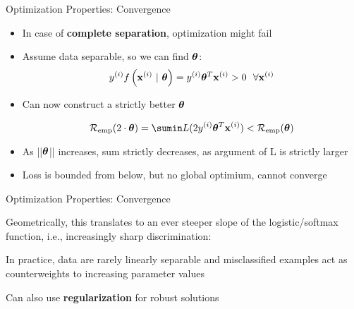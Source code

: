 \documentclass[11pt,compress,t,notes=noshow, xcolor=table]{beamer}
\begin{document}
\begin{frame2}[footnotesize]{Optimization Properties: Convergence}


\begin{itemize}

\item In case of \textbf{complete separation}, optimization might 
fail

{
}

\item Assume data separable, so we can find $\bm{\theta}$:
$$ y^{(i)} f\left(\mathbf{x}^{(i)} ~|~ \bm{\theta}\right) = y^{(i)} \bm{\theta}^T \mathbf{x}^{(i)} > 0 ~~ \forall \mathbf{x}^{(i)}$$

\item Can now construct a strictly better $\bm{\theta}$

$$    
\riske(2 \cdot \thetav) = \sumin L ( 2 \yi \thetav^T \xi) < \risket
$$

\item As ||$\bm{\theta}$|| increases, sum strictly decreases, as argument of L is strictly larger

\item Loss is bounded from below, but no global optimium, cannot converge
\end{itemize}

\end{frame2}

\begin{framei}[sep=L]{Optimization Properties: Convergence}

\item
Geometrically, this translates to an ever steeper slope of the 
logistic/softmax function, i.e., increasingly sharp discrimination:

\vfill

%
{
}%
\item In practice, data are rarely linearly separable and misclassified 
examples act as counterweights to increasing parameter values
\item Can also use \textbf{regularization} for  robust solutions

\end{framei}


\endlecture
\end{document}
